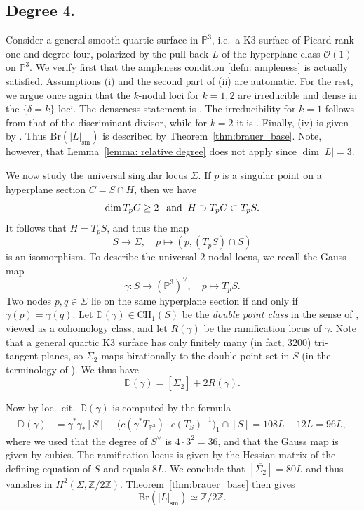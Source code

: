 \documentclass[11pt]{amsart}
\theoremstyle{plain}
\theoremstyle{definition}
\theoremstyle{remark}
\begin{document}
\subsection{Degree $4$.} \label{sec: degree 4 K3} Consider a general smooth quartic surface in $\mathbb P^3$, i.e.~a K3 surface of Picard rank one and degree four, polarized by the pull-back $L$ of the hyperplane class $\mathcal{O}(1)$ on $\mathbb P^3$. We verify first that the ampleness condition \ref{defn: ampleness} is actually satisfied. Assumptions (i) and the second part of (ii) are automatic. For the rest, we argue once again that the $k${-nodal} loci for $k=1,2$ are irreducible and dense in the $\{\delta = k\}$ loci. The denseness statement is \cite[Corollary~1.2]{ChenXi}. The irreducibility for $k=1$ follows from that of the discriminant divisor, while for $k=2$ it is \cite[Theorem~9.2]{Ciliberto-Dedieu-Limits}. Finally, (iv) is given by \cite{doublepointcurve}. Thus $\mathrm{Br}(|L|_\mathrm{sm})$ is described by Theorem~\ref{thm:brauer_base}. Note, however, that Lemma~\ref{lemma: relative degree} does not apply since $\dim |L| = 3$.

We now study the universal singular locus $\Sigma$. If $p$ is a singular point on a hyperplane section $C = S \cap H$, then we have
\[
\dim T_p C \geq 2 \textnormal{ \:\:and \:} H \supset T_p C \subset T_p S.
\]
It follows that $H = T_p S$, and thus the map
\[
S \to \Sigma, \quad p \mapsto (p, (T_p S) \cap S)
\]
is an isomorphism. To describe the universal $2$-nodal locus, we recall the Gauss map
\[
\gamma: S \to (\mathbb P^3)^\vee, \quad p \mapsto T_p S.
\]
Two nodes $p, q \in \Sigma$ lie on the same hyperplane section if and only if $\gamma(p) = \gamma(q)$. Let $\mathbb D(\gamma) \in \mathrm{CH}_1(S)$ be the \textit{double point class} in the sense of \cite[Chapter~9.3]{Fulton}, viewed as a cohomology class, and let $R(\gamma)$ be the ramification locus of $\gamma$. Note that a general quartic K3 surface has only finitely many (in fact, $3200$) tri-tangent planes, so $\Sigma_2$ maps birationally to the double point set in $S$ (in the terminology of \cite{Fulton}). We thus have
\[
\mathbb D(\gamma) = [\overline{\Sigma_2}] + 2 R(\gamma).
\]

Now by loc.~cit.~$\mathbb D(\gamma)$ is computed by the formula
\begin{align*}
\mathbb D(\gamma) &= \gamma^* {\gamma}_*[S] - \big(c(\gamma^* T_{\mathbb {P}^3}) \cdot c(T_S)^{-1}\big)_1 \cap [S] = 108 L - 12 L = 96 L,
\end{align*}
where we used that the degree of $S^\vee$ is $4\cdot 3^2 = 36$, and that the Gauss map is given by cubics. The ramification locus is given by the Hessian matrix of the defining equation of $S$ and equals $8 L$. We conclude that $[\overline{\Sigma_2}] = 80 L$
and thus vanishes in $H^2(\Sigma, \mathbb Z/ 2 \mathbb Z)$. Theorem~\ref{thm:brauer_base} then gives
\[
\mathrm{Br}(|L|_\mathrm{sm}) \simeq \mathbb Z/ 2\mathbb Z.
\]
\end{document}
